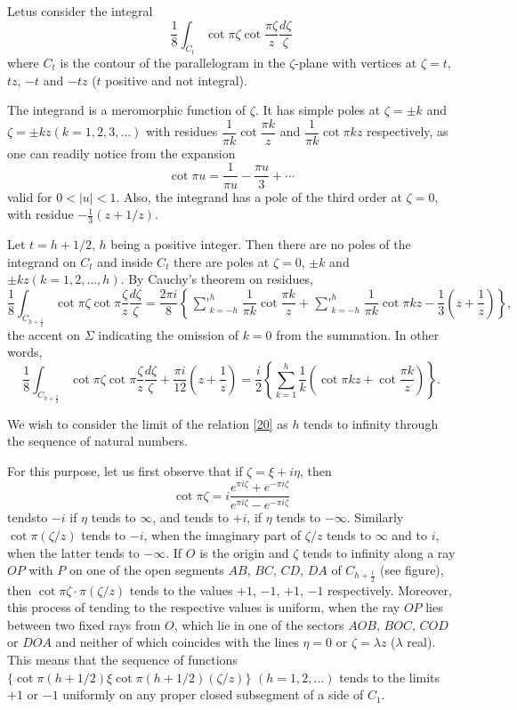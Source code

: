 Let\pageoriginale us consider the integral
$$
\frac{1}{8}\int_{C_{t}}\cot \pi\zeta\cot \frac{\pi
  \zeta}{z}\frac{d\zeta}{\zeta}
$$
where $C_{t}$ is the contour of the parallelogram in the $\zeta$-plane
with vertices at $\zeta=t$, $tz$, $-t$ and $-tz$ ($t$ positive and not
integral).

The integrand is a meromorphic function of $\zeta$. It has simple
poles at $\zeta=\pm k$ and $\zeta=\pm kz(k=1,2,3,\ldots)$ with
residues $\dfrac{1}{\pi k}\cot \dfrac{\pi k}{z}$ and $\dfrac{1}{\pi
  k}\cot \pi kz$ respectively, as one can readily notice from the
expansion
$$
\cot \pi u=\frac{1}{\pi u}-\frac{\pi u}{3}+\cdots
$$
valid for $0<|u|<1$. Also, the integrand has a pole of the third order
at $\zeta=0$, with residue $-\frac{1}{3}(z+1/z)$.

Let $t=h+1/2$, $h$ being a positive integer. Then there are no poles
of the integrand on $C_{t}$ and inside $C_{t}$ there are poles at
$\zeta=0$, $\pm k$ and $\pm kz(k=1,2,\ldots,h)$. By Cauchy's theorem
on residues,
{\fontsize{9}{11}\selectfont
$$
\frac{1}{8}\int_{C_{h+\frac{1}{2}}}\cot\pi\zeta\cot\pi\frac{\zeta}{z}\frac{d\zeta}{\zeta}=\frac{2\pi
  i}{8}\left\{\mathop{{\sum}'}^{h}_{k=-h}\frac{1}{\pi k}\cot \frac{\pi
  k}{z}+\mathop{{\sum}'}^{h}_{k=-h}\frac{1}{\pi k}\cot \pi kz-\frac{1}{3}\left(z+\frac{1}{z}\right)\right\},
$$}\relax
the accent on $\Sigma$ indicating the omission of $k=0$ from the
summation. In other words,
\begin{equation*}
\frac{1}{8}\int_{C_{h+\frac{1}{2}}} \cot \pi \zeta \cot
\pi\frac{\zeta}{z} \frac{d\zeta}{\zeta} + \frac{\pi i}{12}
\left(z+\frac{1}{z}\right) = 
\frac{i}{2}\left\{\sum^{h}_{k=1}\frac{1}{k}\left(\cot  
\pi kz+\cot \frac{\pi k}{z}\right)\right\}.\tag{20}\label{20}
\end{equation*}

We wish to consider the limit of the relation \eqref{20} as $h$ tends
to infinity through the sequence of natural numbers.

For this purpose, let us first observe that if $\zeta=\xi+i\eta$, then
$$
\cot \pi \zeta=i\frac{e^{\pi i\zeta}+e^{-\pi i\zeta}}{e^{\pi
    i\zeta}-e^{-\pi i\zeta}}
$$
tends\pageoriginale to $-i$ if $\eta$ tends to $\infty$, and tends to
$+i$, if $\eta$ tends to $-\infty$. Similarly $\cot\pi(\zeta/z)$ tends
to $-i$, when the imaginary part of $\zeta/z$ tends to $\infty$ and to
$i$, when the latter tends to $-\infty$. If $O$ is the origin and
$\zeta$ tends to infinity along a ray $OP$ with $P$ on one of the open
segments $AB$, $BC$, $CD$, $DA$ of $C_{h+\frac{1}{2}}$ (see figure),
then $\cot \pi\zeta\cdot \pi(\zeta/z)$ tends to the values $+1$, $-1$,
$+1$, $-1$ respectively. Moreover, this process of tending to the
respective values is uniform, when the ray $OP$ lies between two fixed
rays from $O$, which lie in one of the sectors $AOB$, $BOC$, $COD$ or
$DOA$ and neither of which coincides with the lines $\eta=0$ or
$\zeta=\lambda z$ ($\lambda$ real). This means that the sequence of
functions $\{\cot \pi(h+1/2)\xi \cot\pi(h+1/2)(\zeta/z)\}$
$(h=1,2,\ldots)$ tends to the limits $+1$ or $-1$ uniformly on any
proper closed subsegment of a side of $C_{1}$.

